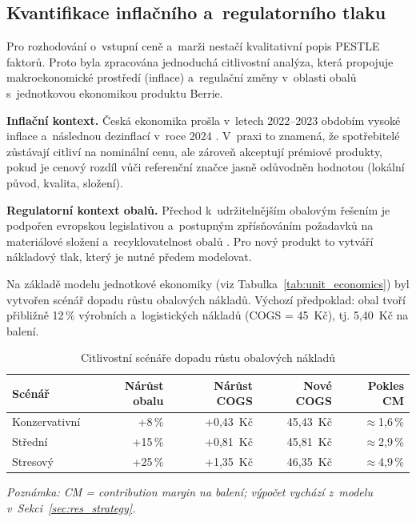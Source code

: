 \subsection{Kvantifikace inflačního a~regulatorního tlaku}
\label{subsec:res_pestle_quant}

Pro rozhodování o~vstupní ceně a~marži nestačí kvalitativní popis PESTLE faktorů. Proto byla zpracována jednoduchá citlivostní analýza, která propojuje makroekonomické prostředí (inflace) a~regulační změny v~oblasti obalů s~jednotkovou ekonomikou produktu Berrie.

\textbf{Inflační kontext.} Česká ekonomika prošla v~letech 2022--2023 obdobím vysoké inflace a~následnou dezinflací v~roce 2024 \parencite{czso_inflace_2025}. V~praxi to znamená, že spotřebitelé zůstávají citliví na nominální cenu, ale zároveň akceptují prémiové produkty, pokud je cenový rozdíl vůči referenční značce jasně odůvodněn hodnotou (lokální původ, kvalita, složení).

\textbf{Regulatorní kontext obalů.} Přechod k~udržitelnějším obalovým řešením je podpořen evropskou legislativou a~postupným zpřísňováním požadavků na materiálové složení a~recyklovatelnost obalů \parencite{eu_ppwr_2024}. Pro nový produkt to vytváří nákladový tlak, který je nutné předem modelovat.

Na základě modelu jednotkové ekonomiky (viz Tabulka~\ref{tab:unit_economics}) byl vytvořen scénář dopadu růstu obalových nákladů. Výchozí předpoklad: obal tvoří přibližně 12\,\% výrobních a~logistických nákladů (COGS = 45~Kč), tj. 5,40~Kč na balení.

\begin{table}[H]
\centering
\caption{Citlivostní scénáře dopadu růstu obalových nákladů}
\label{tab:packaging_scenarios}
\begin{tabular}{lrrrr}
\toprule
\textbf{Scénář} & \textbf{Nárůst obalu} & \textbf{Nárůst COGS} & \textbf{Nové COGS} & \textbf{Pokles CM} \\
\midrule
Konzervativní & +8\,\% & +0,43~Kč & 45,43~Kč & $\approx$1,6\,\% \\
Střední & +15\,\% & +0,81~Kč & 45,81~Kč & $\approx$2,9\,\% \\
Stresový & +25\,\% & +1,35~Kč & 46,35~Kč & $\approx$4,9\,\% \\
\bottomrule
\end{tabular}
\end{table}

\textit{Poznámka: CM = contribution margin na balení; výpočet vychází z~modelu v~Sekci~\ref{sec:res_strategy}.}

